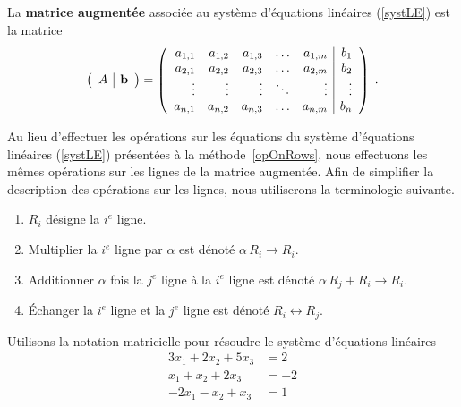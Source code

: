 {\begin{defn} 
La {\bfseries matrice augmentée} associée au
système d'équations linéaires (\ref{systLE}) est la matrice
\[
\left(\begin{array}{c|c}{A}&{\mathbf{b}}\end{array}\right) = \left(\begin{array}{rrrrr|r}
a_{1,1} & a_{1,2} & a_{1,3} & \ldots & a_{1,m} & b_1 \\
a_{2,1} & a_{2,2} & a_{2,3} & \ldots & a_{2,m} & b_2 \\
\vdots & \vdots & \vdots & \ddots & \vdots & \vdots \\
a_{n,1} & a_{n,2} & a_{n,3} & \ldots & a_{n,m} & b_n
\end{array}\right) \; .
\]
\end{defn}

Au lieu d'effectuer les opérations sur les équations du système
d'équations linéaires (\ref{systLE}) présentées à la
méthode~\ref{opOnRows}, nous effectuons les mêmes opérations
sur les lignes de la matrice augmentée.  Afin de simplifier la
description des opérations sur les lignes, nous utiliserons la
terminologie suivante.

\begin{defn}
\begin{enumerate}
\item $R_i$ désigne la $i^e$ ligne.
\item Multiplier la $i^e$ ligne par $\alpha$ est dénoté \quad
$\alpha\,R_i \to R_i$.
\item Additionner $\alpha$ fois la $j^e$ ligne à la $i^e$ ligne est dénoté
\quad $\alpha\,R_j + R_i \to R_i$. 
\item Échanger la $i^e$ ligne et la $j^e$ ligne est dénoté \quad
$R_i \leftrightarrow R_j$.
\end{enumerate}
\end{defn}

\begin{egg}
Utilisons la notation matricielle pour résoudre le système d'équations
linéaires
\begin{equation} \label{exSEL1}
\begin{split}
3x_1 + 2x_2 + 5x_3 &= 2\\
x_1 + x_2 + 2x_3 &= -2\\
-2x_1 - x_2 + x_3 &= 1
\end{split}
\end{equation}


\end{egg}}
